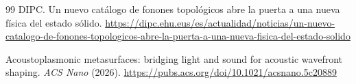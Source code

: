 \documentclass[11pt,a4paper]{article}
\begin{document}
\begin{thebibliography}{99}
DIPC.
\newblock Un nuevo catálogo de fonones topológicos abre la puerta a una nueva física del estado sólido.
\newblock \url{https://dipc.ehu.eus/es/actualidad/noticias/un-nuevo-catalogo-de-fonones-topologicos-abre-la-puerta-a-una-nueva-fisica-del-estado-solido}

Acoustoplasmonic metasurfaces: bridging light and sound for acoustic wavefront shaping.
\newblock \emph{ACS Nano} (2026).
\newblock \url{https://pubs.acs.org/doi/10.1021/acsnano.5c20889}

\end{thebibliography}
\end{document}
